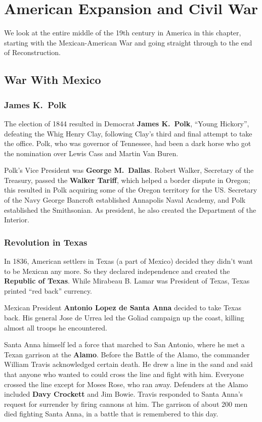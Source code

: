 \chapter{American Expansion and Civil War}

We look at the entire middle of the 19th century in America in this chapter,
starting with the Mexican-American War and going straight through to the end of Reconstruction.

\section{War With Mexico}

\subsection*{James K.\ Polk}

The election of 1844 resulted in Democrat \textbf{James K.\ Polk}, ``Young Hickory'', defeating the Whig Henry Clay,
following Clay's third and final attempt to take the office.
Polk, who was governor of Tennessee, had been a dark horse who got the nomination over Lewis Cass and Martin Van Buren.

Polk's Vice President was \textbf{George M.\ Dallas}.
Robert Walker, Secretary of the Treasury, passed the \textbf{Walker Tariff},
which helped a border dispute in Oregon;
this resulted in Polk acquiring some of the Oregon territory for the US\@.
Secretary of the Navy George Bancroft established Annapolis Naval Academy,
and Polk established the Smithsonian.
As president, he also created the Department of the Interior.

\subsection*{Revolution in Texas}

In 1836, American settlers in Texas (a part of Mexico) decided they didn't want to be Mexican any more.
So they declared independence and created the \textbf{Republic of Texas}.
While Mirabeau B. Lamar was President of Texas, Texas printed ``red back'' currency.

Mexican President \textbf{Antonio Lopez de Santa Anna} decided to take Texas back.
His general Jose de Urrea led the Goliad campaign up the coast, killing almost all troops he encountered.

Santa Anna himself led a force that marched to San Antonio, where he met a Texan garrison at the \textbf{Alamo}.
Before the Battle of the Alamo, the commander William Travis acknowledged certain death.
He drew a line in the sand and said that anyone who wanted to could cross the line and fight with him.
Everyone crossed the line except for Moses Rose, who ran away.
Defenders at the Alamo included \textbf{Davy Crockett} and Jim Bowie.
Travis responded to Santa Anna's request for surrender by firing cannons at him.
The garrison of about 200 men died fighting Santa Anna, in a battle that is remembered to this day.

